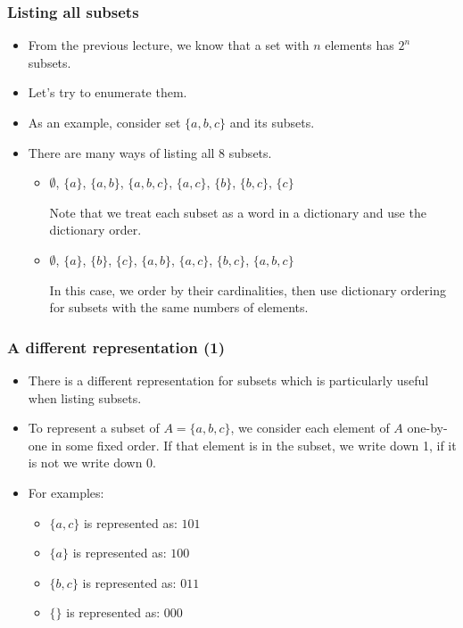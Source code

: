 

\begin{frame}\frametitle{Listing all subsets}
  \begin{itemize}
  \item From the previous lecture, we know that a set with $n$
    elements has $2^n$ subsets.
  \item Let's try to enumerate them. \pause
  \item As an example, consider set $\{a,b,c\}$ and its subsets.
  \item There are many ways of listing all 8 subsets.
    \pause
    \begin{itemize}
    \item $\emptyset$, $\{a\}$, $\{a,b\}$, $\{a,b,c\}$,
      $\{a,c\}$, $\{b\}$, $\{b,c\}$, $\{c\}$
      \pause

      Note that we treat each subset as a word in a dictionary and use
      the dictionary order.
      \pause
      
    \item $\emptyset$, $\{a\}$, $\{b\}$, $\{c\}$,
      $\{a,b\}$, $\{a,c\}$, $\{b,c\}$, $\{a,b,c\}$
      \pause

      In this case, we order by their cardinalities, then use
      dictionary ordering for subsets with the same numbers of
      elements.
    \end{itemize}
  \end{itemize}
\end{frame}

\begin{frame}\frametitle{A different representation (1)}
  \begin{itemize}
  \item There is a different representation for subsets which is
    particularly useful when listing subsets.
  \item To represent a subset of $A=\{a,b,c\}$, we consider each
    element of $A$ one-by-one in some fixed order.  If that element is
    in the subset, we write down 1, if it is not we write down 0.
  \item For examples:
    \begin{itemize}
    \item $\{a,c\}$ is represented as: \pause $101$
    \item $\{a\}$ is represented as: \pause $100$
    \item $\{b,c\}$ is represented as: \pause $011$
    \item $\{\}$ is represented as: \pause $000$
    \end{itemize}
  \end{itemize}
\end{frame}

